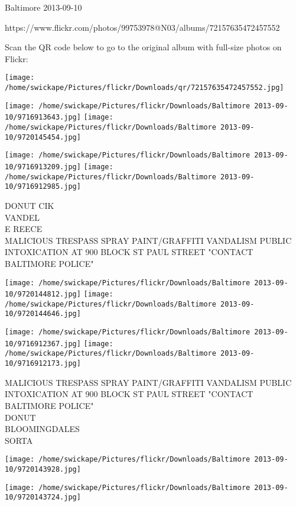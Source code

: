 \documentclass[10pt,letterpaper]{article}
\begin{document}
Baltimore 2013-09-10

https://www.flickr.com/photos/99753978@N03/albums/72157635472457552

Scan the QR code below to go to the original album with full-size photos on Flickr:

\texttt{[image: /home/swickape/Pictures/flickr/Downloads/qr/72157635472457552.jpg]}
\pagebreak

\texttt{[image: /home/swickape/Pictures/flickr/Downloads/Baltimore 2013-09-10/9716913643.jpg]}
\texttt{[image: /home/swickape/Pictures/flickr/Downloads/Baltimore 2013-09-10/9720145454.jpg]}

\texttt{[image: /home/swickape/Pictures/flickr/Downloads/Baltimore 2013-09-10/9716913209.jpg]}
\texttt{[image: /home/swickape/Pictures/flickr/Downloads/Baltimore 2013-09-10/9716912985.jpg]}

DONUT CIK\\
VANDEL\\
E REECE\\
MALICIOUS TRESPASS SPRAY PAINT/GRAFFITI VANDALISM PUBLIC INTOXICATION AT 900 BLOCK ST PAUL STREET "CONTACT BALTIMORE POLICE"\\
\pagebreak

\texttt{[image: /home/swickape/Pictures/flickr/Downloads/Baltimore 2013-09-10/9720144812.jpg]}
\texttt{[image: /home/swickape/Pictures/flickr/Downloads/Baltimore 2013-09-10/9720144646.jpg]}

\texttt{[image: /home/swickape/Pictures/flickr/Downloads/Baltimore 2013-09-10/9716912367.jpg]}
\texttt{[image: /home/swickape/Pictures/flickr/Downloads/Baltimore 2013-09-10/9716912173.jpg]}

MALICIOUS TRESPASS SPRAY PAINT/GRAFFITI VANDALISM PUBLIC INTOXICATION AT 900 BLOCK ST PAUL STREET "CONTACT BALTIMORE POLICE"\\
DONUT\\
BLOOMINGDALES\\
SORTA\\
\pagebreak

\texttt{[image: /home/swickape/Pictures/flickr/Downloads/Baltimore 2013-09-10/9720143928.jpg]}

\vspace{0.25in}
\texttt{[image: /home/swickape/Pictures/flickr/Downloads/Baltimore 2013-09-10/9720143724.jpg]}
\end{document}
